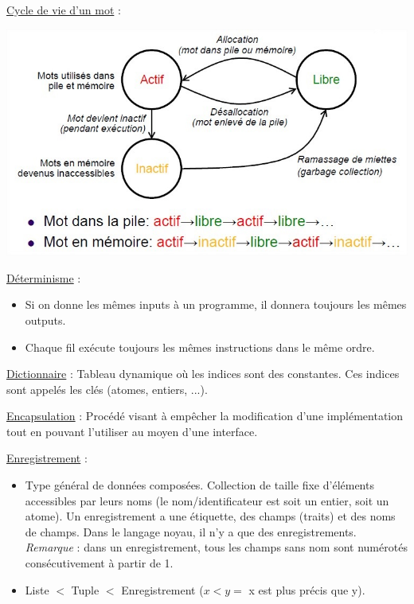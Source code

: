 \documentclass[fr,license=none,skiptoc]{../../../eplsummary}
\begin{document}
\begin{flushleft}
\textcolor{mauvedef}{\underline{Cycle de vie d'un mot}} : 

\begin{center}
\includegraphics[scale=0.5]{CycleVie.jpg}
\end{center}


\textcolor{mauvedef}{\underline{Déterminisme}} : 
\begin{itemize}
\item Si on donne les mêmes inputs à un programme, il donnera toujours les mêmes outputs.
\item Chaque fil exécute toujours les mêmes instructions dans le même ordre.
\end{itemize}
\bigbreak

\textcolor{mauvedef}{\underline{Dictionnaire}} : Tableau dynamique où les indices sont des constantes. Ces indices sont appelés les clés (atomes, entiers, ...). \bigbreak


\textcolor{mauvedef}{\underline{Encapsulation}} : Procédé visant à empêcher la modification d'une implémentation tout en pouvant l'utiliser au moyen d'une interface. \bigbreak



\textcolor{mauvedef}{\underline{Enregistrement}} :

\begin{itemize}
\item Type général de données composées. Collection de taille fixe d’éléments accessibles par leurs noms (le nom/identificateur est soit un entier, soit un atome). Un enregistrement a une étiquette, des champs (traits) et des noms de champs. Dans le langage noyau, il n’y a que des enregistrements. \textit{Remarque} : dans un enregistrement, tous les champs sans nom sont numérotés consécutivement à partir de 1.
\item Liste $<$ Tuple $<$ Enregistrement ($x < y =$ x est plus précis que y).
\end{itemize} \bigbreak




\end{flushleft}
\end{document}
